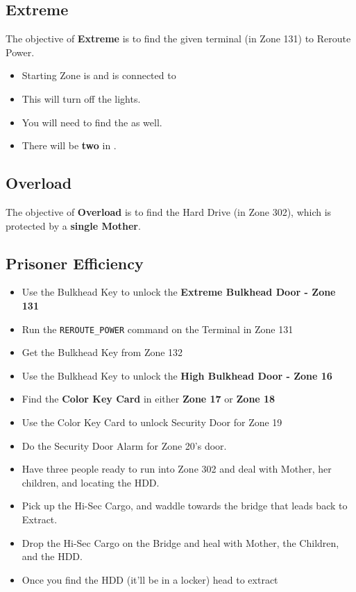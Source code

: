 \subsection{Extreme}

The objective of \textbf{Extreme} is to find the given terminal (in Zone 131) to Reroute Power.
\begin{itemize}
    \item Starting Zone is  and is connected to 
    \item This will turn off the lights.
    \item You will need to find the  as well.
    \item There will be \textbf{two} \gtfoenemyscout{} in .
\end{itemize}

\subsection{Overload}

The objective of \textbf{Overload} is to find the Hard Drive (in Zone 302), which is protected by a \textbf{single Mother}.

\subsection{Prisoner Efficiency}

\begin{itemize}
    \item Use the Bulkhead Key to unlock the \textbf{Extreme Bulkhead Door - Zone 131}
    \item Run the \texttt{REROUTE\_POWER} command on the Terminal in Zone 131
    \item Get the Bulkhead Key from Zone 132
    \item Use the Bulkhead Key to unlock the \textbf{High Bulkhead Door - Zone 16}
    \item Find the \textbf{Color Key Card} in either \textbf{Zone 17} or \textbf{Zone 18}
    \item Use the Color Key Card to unlock Security Door for Zone 19
    \item Do the Security Door Alarm for Zone 20's door.
    \item Have three people ready to run into Zone 302 and deal with Mother, her children, and locating the HDD.
    \item Pick up the Hi-Sec Cargo, and waddle towards the bridge that leads back to Extract.
    \item Drop the Hi-Sec Cargo on the Bridge and heal with Mother, the Children, and the HDD.
    \item Once you find the HDD (it'll be in a locker) head to extract
\end{itemize}
